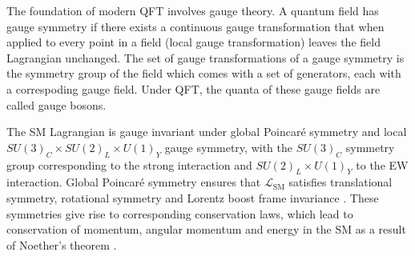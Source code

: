 \documentclass[../thesis.tex]{subfiles}
\begin{document}
The foundation of modern \acs{QFT} involves gauge theory. A quantum field has gauge symmetry if there exists a continuous gauge transformation that when applied to every point in a field (local gauge transformation) leaves the field Lagrangian unchanged. The set of gauge transformations of a gauge symmetry is the symmetry group of the field which comes with a set of generators, each with a correspoding gauge field. Under \acs{QFT}, the quanta of these gauge fields are called gauge bosons.

The \acs{SM} Lagrangian is gauge invariant under global Poincar\'e symmetry and local $SU(3)_C \times SU(2)_L \times U(1)_Y$ gauge symmetry, with the $SU(3)_C$ symmetry group corresponding to the strong interaction and $SU(2)_L \times U(1)_Y$ to the \acs{EW} interaction. Global Poincar\'e symmetry ensures that $\mathcal{L}_\mathrm{SM}$ satisfies translational symmetry, rotational symmetry and Lorentz boost frame invariance \citep{theory:symmetry}. These symmetries give rise to corresponding conservation laws, which lead to conservation of momentum, angular momentum and energy in the \acs{SM} as a result of Noether's theorem \citep{Ba_ados_2016}.
\end{document}
